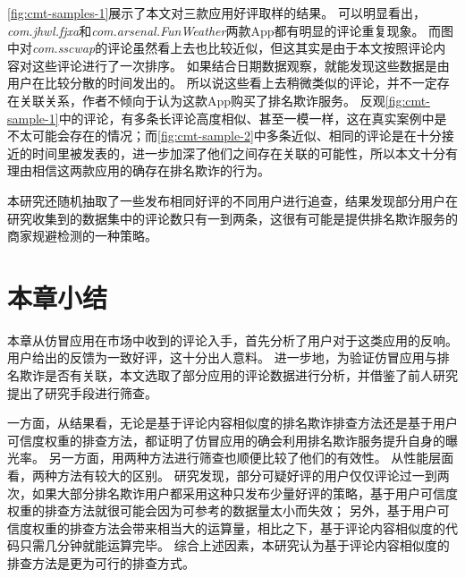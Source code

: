 \autoref{fig:cmt-samples-1}展示了本文对三款应用好评取样的结果。
可以明显看出，\emph{com.jhwl.fjxa}和\emph{com.arsenal.FunWeather}两款App都有明显的评论重复现象。
而图中对\emph{com.sscwap}的评论虽然看上去也比较近似，但这其实是由于本文按照评论内容对这些评论进行了一次排序。
如果结合日期数据观察，就能发现这些数据是由用户在比较分散的时间发出的。
所以说这些看上去稍微类似的评论，并不一定存在关联关系，作者不倾向于认为这款App购买了排名欺诈服务。
反观\autoref{fig:cmt-sample-1}中的评论，有多条长评论高度相似、甚至一模一样，这在真实案例中是不太可能会存在的情况；而\autoref{fig:cmt-sample-2}中多条近似、相同的评论是在十分接近的时间里被发表的，进一步加深了他们之间存在关联的可能性，所以本文十分有理由相信这两款应用的确存在排名欺诈的行为。

本研究还随机抽取了一些发布相同好评的不同用户进行追查，结果发现部分用户在研究收集到的数据集中的评论数只有一到两条，这很有可能是提供排名欺诈服务的商家规避检测的一种策略。

\section{本章小结}
本章从仿冒应用在市场中收到的评论入手，首先分析了用户对于这类应用的反响。
用户给出的反馈为一致好评，这十分出人意料。
进一步地，为验证仿冒应用与排名欺诈是否有关联，本文选取了部分应用的评论数据进行分析，并借鉴了前人研究提出了研究手段进行筛查。

一方面，从结果看，无论是基于评论内容相似度的排名欺诈排查方法还是基于用户可信度权重的排查方法，都证明了仿冒应用的确会利用排名欺诈服务提升自身的曝光率。
另一方面，用两种方法进行筛查也顺便比较了他们的有效性。
从性能层面看，两种方法有较大的区别。
研究发现，部分可疑好评的用户仅仅评论过一到两次，如果大部分排名欺诈用户都采用这种只发布少量好评的策略，基于用户可信度权重的排查方法就很可能会因为可参考的数据量太小而失效；
另外，基于用户可信度权重的排查方法会带来相当大的运算量，相比之下，基于评论内容相似度的代码只需几分钟就能运算完毕。
综合上述因素，本研究认为基于评论内容相似度的排查方法是更为可行的排查方式。
